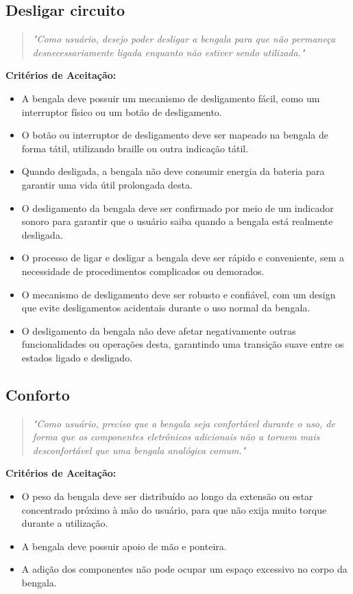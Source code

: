     \subsection{Desligar circuito}
    \begin{quote}
    \textit{"Como usuário, desejo poder desligar a bengala para que não permaneça desnecessariamente ligada enquanto não estiver sendo utilizada."}
    \end{quote}    
    \noindent\textbf{Critérios de Aceitação:}
    \begin{itemize}
        \item A bengala deve possuir um mecanismo de desligamento fácil, como um interruptor físico ou um botão de desligamento.
        \item O botão ou interruptor de desligamento deve ser mapeado na bengala de forma tátil, utilizando braille ou outra indicação tátil.
        \item Quando desligada, a bengala não deve consumir energia da bateria para garantir uma vida útil prolongada desta.
        \item O desligamento da bengala deve ser confirmado por meio de um indicador sonoro para garantir que o usuário saiba quando a bengala está realmente desligada.
        \item O processo de ligar e desligar a bengala deve ser rápido e conveniente, sem a necessidade de procedimentos complicados ou demorados.
        \item O mecanismo de desligamento deve ser robusto e confiável, com um design que evite desligamentos acidentais durante o uso normal da bengala.
        \item O desligamento da bengala não deve afetar negativamente outras funcionalidades ou operações desta, garantindo uma transição suave entre os estados ligado e desligado.
    \end{itemize}
                        
    \subsection{Conforto}
    \begin{quote}
    \textit{"Como usuário, preciso que a bengala seja confortável durante o uso, de forma que os componentes eletrônicos adicionais não a tornem mais desconfortável que uma bengala analógica comum."}
    \end{quote}    
    \noindent\textbf{Critérios de Aceitação:}
    \begin{itemize}
        \item O peso da bengala deve ser distribuído ao longo da extensão ou estar concentrado próximo à mão do usuário, para que não exija muito torque durante a utilização.
        \item A bengala deve possuir apoio de mão e ponteira.
        \item A adição dos componentes não pode ocupar um espaço excessivo no corpo da bengala.
    \end{itemize}

